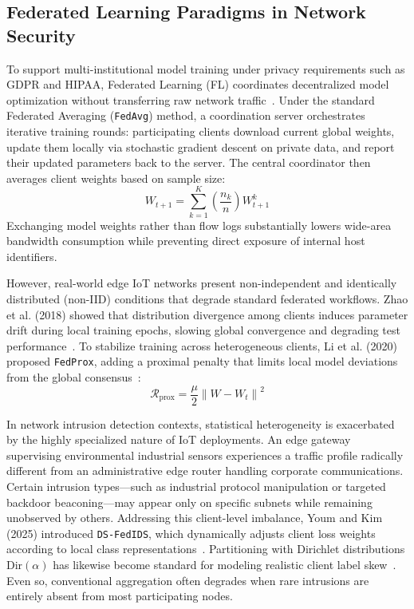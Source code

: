 \documentclass[12pt,a4paper]{report}
\begin{document}
\subsection{Federated Learning Paradigms in Network Security}
To support multi-institutional model training under privacy requirements such as GDPR and HIPAA, Federated Learning (FL) coordinates decentralized model optimization without transferring raw network traffic~\cite{mcmahan2017federated}. Under the standard Federated Averaging (\texttt{FedAvg}) method, a coordination server orchestrates iterative training rounds: participating clients download current global weights, update them locally via stochastic gradient descent on private data, and report their updated parameters back to the server. The central coordinator then averages client weights based on sample size:
\begin{equation}
W_{t+1} = \sum_{k=1}^K \left( \frac{n_k}{n} \right) W_{t+1}^k
\label{eq:fedavg_theory}
\end{equation}
Exchanging model weights rather than flow logs substantially lowers wide-area bandwidth consumption while preventing direct exposure of internal host identifiers.

However, real-world edge IoT networks present non-independent and identically distributed (non-IID) conditions that degrade standard federated workflows. Zhao et al. (2018) showed that distribution divergence among clients induces parameter drift during local training epochs, slowing global convergence and degrading test performance~\cite{zhao2018federated}. To stabilize training across heterogeneous clients, Li et al. (2020) proposed \texttt{FedProx}, adding a proximal penalty that limits local model deviations from the global consensus~\cite{li2020federatedchallenges}:
\begin{equation}
\mathcal{R}_{\text{prox}} = \frac{\mu}{2} \left\| W - W_t \right\|^2
\end{equation}

In network intrusion detection contexts, statistical heterogeneity is exacerbated by the highly specialized nature of IoT deployments. An edge gateway supervising environmental industrial sensors experiences a traffic profile radically different from an administrative edge router handling corporate communications. Certain intrusion types---such as industrial protocol manipulation or targeted backdoor beaconing---may appear only on specific subnets while remaining unobserved by others. Addressing this client-level imbalance, Youm and Kim (2025) introduced \texttt{DS-FedIDS}, which dynamically adjusts client loss weights according to local class representations~\cite{youm2025dsfedids}. Partitioning with Dirichlet distributions $\text{Dir}(\alpha)$ has likewise become standard for modeling realistic client label skew~\cite{hsu2019noniid}. Even so, conventional aggregation often degrades when rare intrusions are entirely absent from most participating nodes.
\end{document}
